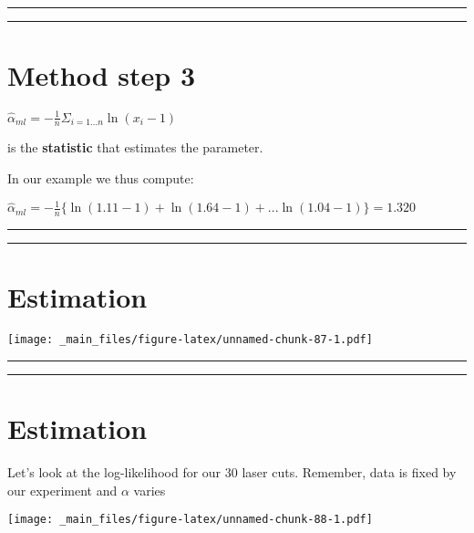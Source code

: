 \documentclass[
]{book}
\begin{document}
\begin{center}\rule{0.5\linewidth}{0.5pt}\end{center}

\begin{center}\rule{0.5\linewidth}{0.5pt}\end{center}

\hypertarget{method-step-3-1}{%
\section{Method step 3}\label{method-step-3-1}}

\(\hat{\alpha}_{ml}=-\frac{1}{n}\Sigma_{i=1...n} \ln (x_i-1)\)

is the \textbf{statistic} that estimates the parameter.

In our example we thus compute:

\(\hat{\alpha}_{ml}=-\frac{1}{n}\{ \ln (1.11-1)+ \ln (1.64-1)+...\ln (1.04-1)\}=1.320\)

\begin{center}\rule{0.5\linewidth}{0.5pt}\end{center}

\begin{center}\rule{0.5\linewidth}{0.5pt}\end{center}

\hypertarget{estimation-1}{%
\section{Estimation}\label{estimation-1}}

\texttt{[image: \_main\_files/figure-latex/unnamed-chunk-87-1.pdf]}

\begin{center}\rule{0.5\linewidth}{0.5pt}\end{center}

\begin{center}\rule{0.5\linewidth}{0.5pt}\end{center}

\hypertarget{estimation-2}{%
\section{Estimation}\label{estimation-2}}

Let's look at the log-likelihood for our \(30\) laser cuts. Remember, data is fixed by our experiment and \(\alpha\) varies

\texttt{[image: \_main\_files/figure-latex/unnamed-chunk-88-1.pdf]}
\end{document}
